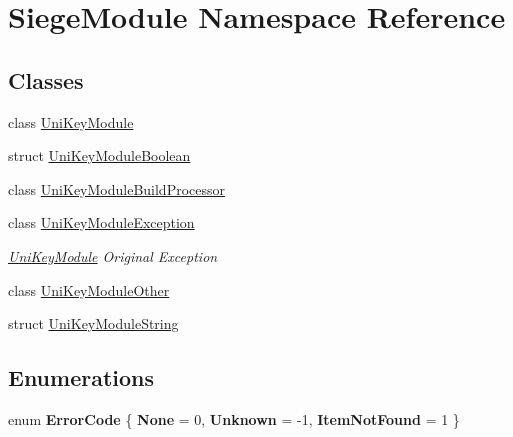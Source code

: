 \hypertarget{namespace_siege_module}{}\section{Siege\+Module Namespace Reference}
\label{namespace_siege_module}
\subsection*{Classes}
\begin{DoxyCompactItemize}
\item 
class \mbox{\hyperlink{class_siege_module_1_1_uni_key_module}{Uni\+Key\+Module}}
\item 
struct \mbox{\hyperlink{struct_siege_module_1_1_uni_key_module_boolean}{Uni\+Key\+Module\+Boolean}}
\item 
class \mbox{\hyperlink{class_siege_module_1_1_uni_key_module_build_processor}{Uni\+Key\+Module\+Build\+Processor}}
\item 
class \mbox{\hyperlink{class_siege_module_1_1_uni_key_module_exception}{Uni\+Key\+Module\+Exception}}
\begin{DoxyCompactList}\small\item\em \mbox{\hyperlink{class_siege_module_1_1_uni_key_module}{Uni\+Key\+Module}} Original Exception \end{DoxyCompactList}\item 
class \mbox{\hyperlink{class_siege_module_1_1_uni_key_module_other}{Uni\+Key\+Module\+Other}}
\item 
struct \mbox{\hyperlink{struct_siege_module_1_1_uni_key_module_string}{Uni\+Key\+Module\+String}}
\end{DoxyCompactItemize}
\subsection*{Enumerations}
\begin{DoxyCompactItemize}
\item 
\mbox{\label{namespace_siege_module_a9dfa994d8f593ddbe2dbfec0b829d3da}} 
enum {\bfseries Error\+Code} \{ {\bfseries None} = 0, 
{\bfseries Unknown} = -\/1, 
{\bfseries Item\+Not\+Found} = 1
 \}
\end{DoxyCompactItemize}
